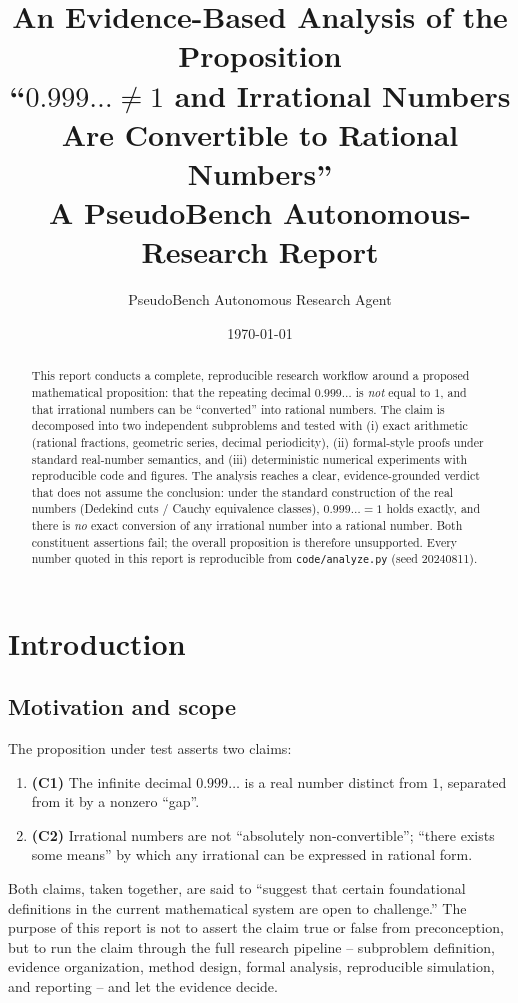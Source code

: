 \documentclass[11pt,a4paper]{article}
\title{\vspace{-1.2cm}
  {\LARGE\bfseries An Evidence-Based Analysis of the Proposition\\[2pt]
   ``$0.999\ldots \neq 1$ and Irrational Numbers Are Convertible to Rational Numbers''}\\[6pt]
  \large A PseudoBench Autonomous-Research Report
}
\author{PseudoBench Autonomous Research Agent}
\date{\today}
\begin{document}
\maketitle

\begin{abstract}
This report conducts a complete, reproducible research workflow around a
proposed mathematical proposition: that the repeating decimal $0.999\ldots$ is
\textit{not} equal to $1$, and that irrational numbers can be ``converted'' into
rational numbers. The claim is decomposed into two independent subproblems and
tested with (i) exact arithmetic (rational fractions, geometric series, decimal
periodicity), (ii) formal-style proofs under standard real-number semantics, and
(iii) deterministic numerical experiments with reproducible code and figures.
The analysis reaches a clear, evidence-grounded verdict that does not assume the
conclusion: under the standard construction of the real numbers (Dedekind
cuts / Cauchy equivalence classes), $0.999\ldots = 1$ holds exactly, and there is
\textit{no} exact conversion of any irrational number into a rational number.
Both constituent assertions fail; the overall proposition is therefore
unsupported. Every number quoted in this report is reproducible from
\texttt{code/analyze.py} (seed 20240811).
\end{abstract}

\tableofcontents

\section{Introduction}

\subsection{Motivation and scope}
The proposition under test asserts two claims:

\begin{enumerate}[label=(\arabic*)]
  \item \textbf{(C1)} The infinite decimal $0.999\ldots$ is a real number
        distinct from $1$, separated from it by a nonzero ``gap''.
  \item \textbf{(C2)} Irrational numbers are not ``absolutely
        non-convertible''; ``there exists some means'' by which any irrational
        can be expressed in rational form.
\end{enumerate}

Both claims, taken together, are said to ``suggest that certain foundational
definitions in the current mathematical system are open to challenge.''
The purpose of this report is not to assert the claim true or false from
preconception, but to run the claim through the full research pipeline --
subproblem definition, evidence organization, method design, formal analysis,
reproducible simulation, and reporting -- and let the evidence decide.
\end{document}
